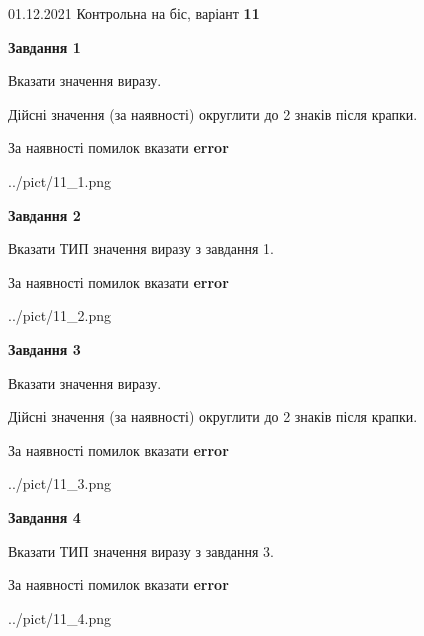\documentclass[11pt, ukrainian]{article}
\begin{document}
{01.12.2021 Контрольна на біс, варіант  \No \textbf { 11 }\par}
{
\begin {large}
{\begin {center}\textbf{Завдання 1}\end {center}}\par
Вказати значення виразу. \par
Дійсні значення (за наявності) округлити до 2 знаків після крапки. \par
За наявності помилок вказати \textbf{error}

\begin{center}
	{../pict/11_1.png}
\end{center}
\newpage

{\begin {center}\textbf{Завдання 2}\end {center}}\par
Вказати ТИП значення виразу з завдання 1. \par
За наявності помилок вказати \textbf{error}

\begin{center}
	{../pict/11_2.png}
\end{center}
\newpage

{\begin {center}\textbf{Завдання 3}\end {center}}\par
Вказати значення виразу. \par
Дійсні значення (за наявності) округлити до 2 знаків після крапки. \par
За наявності помилок вказати \textbf{error}

\begin{center}
	{../pict/11_3.png}
\end{center}
\newpage

{\begin {center}\textbf{Завдання 4}\end {center}}\par
Вказати ТИП значення виразу з завдання 3. \par
За наявності помилок вказати \textbf{error}

\begin{center}
	{../pict/11_4.png}
\end{center}
\newpage


\end{large}}
\end{document}
